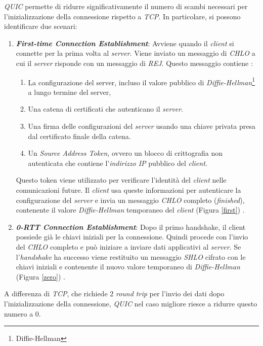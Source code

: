 \noindent \emph{QUIC} permette di ridurre significativamente il numero di scambi necessari per l'inizializzazione della connessione rispetto a \emph{TCP}. In particolare, si possono identificare due scenari:
\begin{enumerate}
    \item \textit{\textbf{First-time Connection Establishment}}: Avviene quando il \emph{client} si connette per la prima volta al \emph{server}. Viene inviato un messaggio di \emph{\gls*{CHLO}{}} a cui il \emph{server} risponde con un messaggio di \emph{\gls*{REJ}{}}. 
    Questo messaggio contiene : 

        \begin{enumerate}[label=\roman*]
            \item La configurazione del server, incluso il valore pubblico di \emph{Diffie-Hellman}\footnote{\gls{Diffie-Hellman}} a lungo termine del server,
            \item Una catena di certificati che autenticano il \emph{server}.
            \item Una firma delle configurazioni del \emph{server} usando una chiave privata presa dal certificato finale della catena.
            \item Un \emph{Source Address Token}, ovvero un blocco di crittografia non autenticata che contiene l'\emph{indirizzo IP} pubblico del \emph{client}.
        \end{enumerate}
        
    Questo token viene utilizzato per verificare l'identità del \emph{client} nelle comunicazioni future. Il \emph{client} usa queste informazioni per autenticare la configurazione del \emph{server} e invia un messaggio \emph{CHLO} completo (\emph{finished}), contenente il valore \emph{Diffie-Hellman} temporaneo del \emph{client} (Figura \ref{first}) \cite{article:handshake}.
    \item \textit{\textbf{0-RTT Connection Establishment}}: Dopo il primo handshake, il client possiede già le chiavi iniziali per la connessione. Quindi procede con l'invio del \emph{CHLO} completo e può iniziare a inviare dati applicativi al \emph{server}.
    Se l'\emph{handshake} ha successo viene restituito un messaggio \emph{\gls*{SHLO}{}} cifrato con le chiavi iniziali e contenente il nuovo valore temporaneo di \emph{Diffie-Hellman} (Figura \ref{zero}) \cite{article:handshake}  .
\end{enumerate}

\noindent A differenza di \emph{TCP}, che richiede 2 \emph{round trip} per l'invio dei dati dopo l'inizializzazione della connessione, \emph{QUIC} nel caso migliore riesce a ridurre questo numero a 0.

